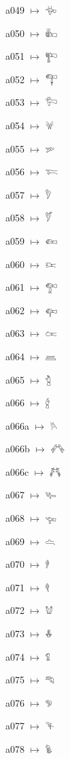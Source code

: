{\noindent a049 $\mapsto$ {\ahfont 𔐷}\par
\noindent a050 $\mapsto$ {\ahfont 𔐸}\par
\noindent a051 $\mapsto$ {\ahfont 𔐹}\par
\noindent a052 $\mapsto$ {\ahfont 𔐺}\par
\noindent a053 $\mapsto$ {\ahfont 𔐻}\par
\noindent a054 $\mapsto$ {\ahfont 𔐼}\par
\noindent a055 $\mapsto$ {\ahfont 𔐽}\par
\noindent a056 $\mapsto$ {\ahfont 𔐾}\par
\noindent a057 $\mapsto$ {\ahfont 𔐿}\par
\noindent a058 $\mapsto$ {\ahfont 𔑀}\par
\noindent a059 $\mapsto$ {\ahfont 𔑁}\par
\noindent a060 $\mapsto$ {\ahfont 𔑂}\par
\noindent a061 $\mapsto$ {\ahfont 𔑃}\par
\noindent a062 $\mapsto$ {\ahfont 𔑄}\par
\noindent a063 $\mapsto$ {\ahfont 𔑅}\par
\noindent a064 $\mapsto$ {\ahfont 𔑆}\par
\noindent a065 $\mapsto$ {\ahfont 𔑇}\par
\noindent a066 $\mapsto$ {\ahfont 𔑈}\par
\noindent a066a $\mapsto$ {\ahfont 𔑉}\par
\noindent a066b $\mapsto$ {\ahfont 𔑊}\par
\noindent a066c $\mapsto$ {\ahfont 𔑋}\par
\noindent a067 $\mapsto$ {\ahfont 𔑌}\par
\noindent a068 $\mapsto$ {\ahfont 𔑍}\par
\noindent a069 $\mapsto$ {\ahfont 𔑎}\par
\noindent a070 $\mapsto$ {\ahfont 𔑏}\par
\noindent a071 $\mapsto$ {\ahfont 𔑐}\par
\noindent a072 $\mapsto$ {\ahfont 𔑑}\par
\noindent a073 $\mapsto$ {\ahfont 𔑒}\par
\noindent a074 $\mapsto$ {\ahfont 𔑓}\par
\noindent a075 $\mapsto$ {\ahfont 𔑔}\par
\noindent a076 $\mapsto$ {\ahfont 𔑕}\par
\noindent a077 $\mapsto$ {\ahfont 𔑖}\par
\noindent a078 $\mapsto$ {\ahfont 𔑗}\par
}

